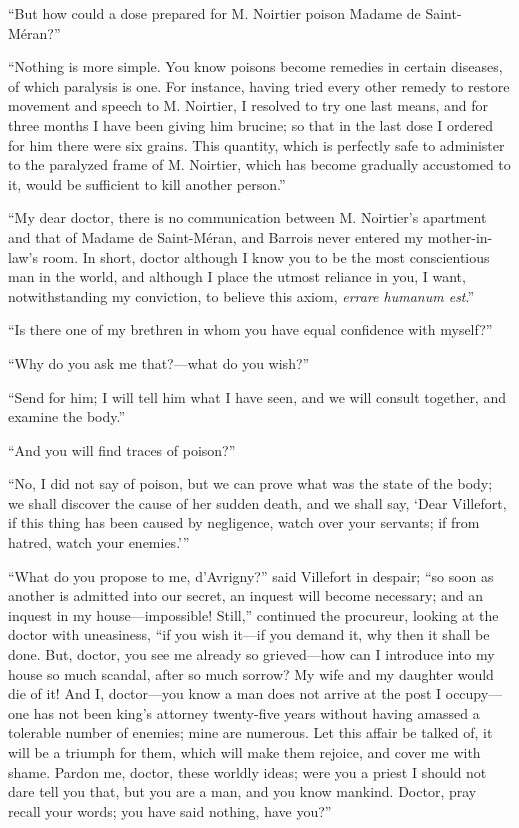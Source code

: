 “But how could a dose prepared for M. Noirtier poison Madame de
Saint-Méran?”

“Nothing is more simple. You know poisons become remedies in certain
diseases, of which paralysis is one. For instance, having tried every
other remedy to restore movement and speech to M. Noirtier, I resolved
to try one last means, and for three months I have been giving him
brucine; so that in the last dose I ordered for him there were six
grains. This quantity, which is perfectly safe to administer to the
paralyzed frame of M. Noirtier, which has become gradually accustomed
to it, would be sufficient to kill another person.”

“My dear doctor, there is no communication between M. Noirtier’s
apartment and that of Madame de Saint-Méran, and Barrois never entered
my mother-in-law’s room. In short, doctor although I know you to be the
most conscientious man in the world, and although I place the utmost
reliance in you, I want, notwithstanding my conviction, to believe this
axiom, \textit{errare humanum est}.”

“Is there one of my brethren in whom you have equal confidence with
myself?”

“Why do you ask me that?—what do you wish?”

“Send for him; I will tell him what I have seen, and we will consult
together, and examine the body.”

“And you will find traces of poison?”

“No, I did not say of poison, but we can prove what was the state of
the body; we shall discover the cause of her sudden death, and we shall
say, ‘Dear Villefort, if this thing has been caused by negligence,
watch over your servants; if from hatred, watch your enemies.’”

“What do you propose to me, d’Avrigny?” said Villefort in despair; “so
soon as another is admitted into our secret, an inquest will become
necessary; and an inquest in my house—impossible! Still,” continued the
procureur, looking at the doctor with uneasiness, “if you wish it—if
you demand it, why then it shall be done. But, doctor, you see me
already so grieved—how can I introduce into my house so much scandal,
after so much sorrow? My wife and my daughter would die of it! And I,
doctor—you know a man does not arrive at the post I occupy—one has not
been king’s attorney twenty-five years without having amassed a
tolerable number of enemies; mine are numerous. Let this affair be
talked of, it will be a triumph for them, which will make them rejoice,
and cover me with shame. Pardon me, doctor, these worldly ideas; were
you a priest I should not dare tell you that, but you are a man, and
you know mankind. Doctor, pray recall your words; you have said
nothing, have you?”

